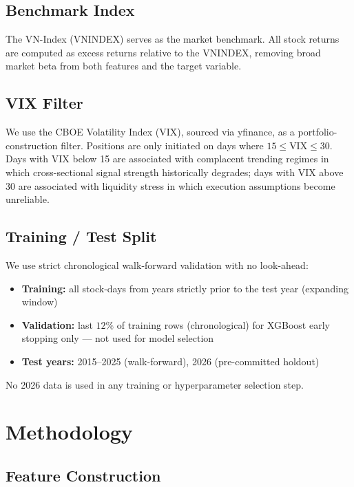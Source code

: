 \documentclass[12pt,a4paper]{article}
\begin{document}


\subsection{Benchmark Index}

The VN-Index (VNINDEX) serves as the market benchmark. All stock returns are
computed as excess returns relative to the VNINDEX, removing broad market beta
from both features and the target variable.

\subsection{VIX Filter}

We use the CBOE Volatility Index (VIX), sourced via yfinance, as a
portfolio-construction filter. Positions are only initiated on days where
$15 \leq \text{VIX} \leq 30$. Days with VIX below 15 are associated with
complacent trending regimes in which cross-sectional signal strength historically
degrades; days with VIX above 30 are associated with liquidity stress in which
execution assumptions become unreliable.

\subsection{Training / Test Split}

We use strict chronological walk-forward validation with no look-ahead:
\begin{itemize}
  \item \textbf{Training:} all stock-days from years strictly prior to the test year
        (expanding window)
  \item \textbf{Validation:} last $12\%$ of training rows (chronological) for
        XGBoost early stopping only --- not used for model selection
  \item \textbf{Test years:} 2015--2025 (walk-forward), 2026 (pre-committed holdout)
\end{itemize}

No 2026 data is used in any training or hyperparameter selection step.

\section{Methodology}
\label{sec:method}

\subsection{Feature Construction}
\label{sec:features}
\end{document}

